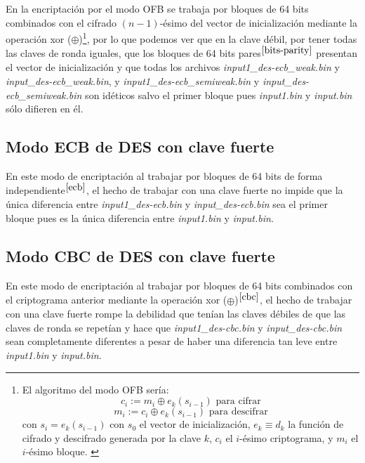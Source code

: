 \documentclass[a4paper, 11pt]{article}
\begin{document}
		En la encriptación por el modo OFB se trabaja por bloques de 64 bits combinados con el cifrado $(n-1)$-ésimo del vector
		de inicialización mediante la operación xor ($\oplus$)\footnote{El algoritmo del modo OFB sería: \[c_i := m_i \oplus
		e_k(s_{i-1}) \text{ para cifrar}\] \[m_i := c_i \oplus e_k(s_{i-1}) \text{ para descifrar}\] con $s_i = e_k(s_{i-1})$
		con $s_0$ el vector de inicialización, $e_k \equiv d_k$ la función de cifrado y descifrado generada por la clave $k$,
		$c_i$ el $i$-ésimo criptograma, y $m_i$ el $i$-ésimo bloque. \label{ofb}}, por lo que podemos ver que en la clave débil,
		por tener todas las claves de ronda iguales, que los bloques de 64 bits pares$^{\ref{bits-parity}}$ presentan el vector
		de inicialización y que todas los archivos \textit{input1\_des-ecb\_weak.bin} y \textit{input\_des-ecb\_weak.bin}, y
		\textit{input1\_des-ecb\_semiweak.bin} y \textit{input\_des-ecb\_semiweak.bin} son idéticos salvo el primer bloque
		pues \textit{input1.bin} y \textit{input.bin} sólo difieren en él.
				
	\subsection{Modo ECB de DES con clave fuerte}
		En este modo de encriptación al trabajar por bloques de 64 bits de forma independiente$^{\ref{ecb}}$, el hecho de trabajar
		con una clave fuerte no impide que la única diferencia entre \textit{input1\_des-ecb.bin} y \textit{input\_des-ecb.bin}
		sea el primer bloque pues es la única diferencia entre \textit{input1.bin} y \textit{input.bin}.
		
	\subsection{Modo CBC de DES con clave fuerte}
		En este modo de encriptación al trabajar por bloques de 64 bits combinados con el criptograma anterior mediante
		la operación xor ($\oplus$)$^{\ref{cbc}}$, el hecho de trabajar con una clave fuerte rompe la debilidad que tenían las
		claves débiles de que las claves de ronda se repetían y hace que \textit{input1\_des-cbc.bin} y \textit{input\_des-cbc.bin}
		sean completamente diferentes a pesar de haber una diferencia tan leve entre \textit{input1.bin} y \textit{input.bin}.
		
\end{document}
